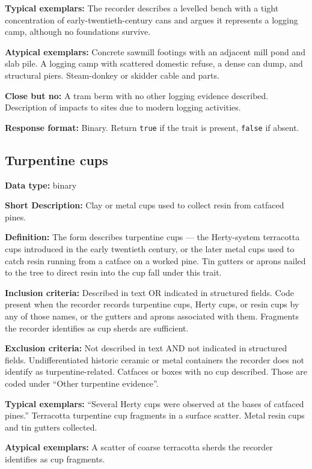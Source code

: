 \documentclass[
]{article}
\begin{document}
\textbf{Typical exemplars:} The recorder describes a levelled bench with
a tight concentration of early-twentieth-century cans and argues it
represents a logging camp, although no foundations survive.

\textbf{Atypical exemplars:} Concrete sawmill footings with an adjacent
mill pond and slab pile. A logging camp with scattered domestic refuse,
a dense can dump, and structural piers. Steam-donkey or skidder cable
and parts.

\textbf{Close but no:} A tram berm with no other logging evidence
described. Description of impacts to sites due to modern logging
activities.

\textbf{Response format:} Binary. Return \texttt{true} if the trait is
present, \texttt{false} if absent.

\subsection{Turpentine cups}\label{turpentine-cups}

\textbf{Data type:} binary

\textbf{Short Description:} Clay or metal cups used to collect resin
from catfaced pines.

\textbf{Definition:} The form describes turpentine cups --- the
Herty-system terracotta cups introduced in the early twentieth century,
or the later metal cups used to catch resin running from a catface on a
worked pine. Tin gutters or aprons nailed to the tree to direct resin
into the cup fall under this trait.

\textbf{Inclusion criteria:} Described in text OR indicated in
structured fields. Code present when the recorder records turpentine
cups, Herty cups, or resin cups by any of those names, or the gutters
and aprons associated with them. Fragments the recorder identifies as
cup sherds are sufficient.

\textbf{Exclusion criteria:} Not described in text AND not indicated in
structured fields. Undifferentiated historic ceramic or metal containers
the recorder does not identify as turpentine-related. Catfaces or boxes
with no cup described. Those are coded under ``Other turpentine
evidence''.

\textbf{Typical exemplars:} ``Several Herty cups were observed at the
bases of catfaced pines.'' Terracotta turpentine cup fragments in a
surface scatter. Metal resin cups and tin gutters collected.

\textbf{Atypical exemplars:} A scatter of coarse terracotta sherds the
recorder identifies as cup fragments.
\end{document}
